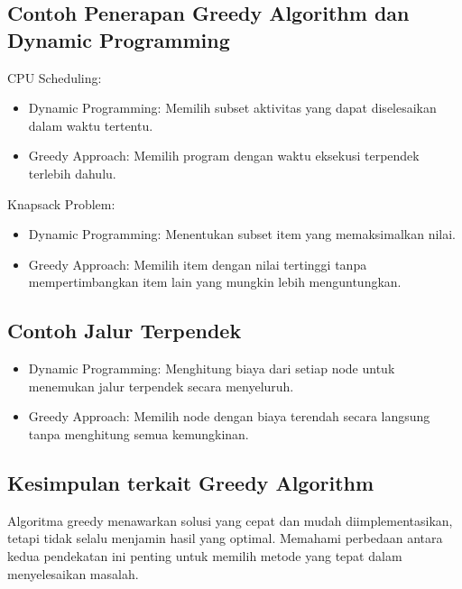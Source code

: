 \documentclass{article}
\begin{document}
\subsection{Contoh Penerapan Greedy Algorithm dan Dynamic Programming}
CPU Scheduling:
\begin{itemize}
    \item Dynamic Programming: Memilih subset aktivitas yang dapat diselesaikan dalam waktu tertentu.
    \item Greedy Approach: Memilih program dengan waktu eksekusi terpendek terlebih dahulu.
\end{itemize}
Knapsack Problem:
\begin{itemize}
    \item Dynamic Programming: Menentukan subset item yang memaksimalkan nilai.
    \item Greedy Approach: Memilih item dengan nilai tertinggi tanpa mempertimbangkan item lain yang mungkin lebih menguntungkan.
\end{itemize}

\subsection{Contoh Jalur Terpendek}
\begin{itemize}
    \item Dynamic Programming: Menghitung biaya dari setiap node untuk menemukan jalur terpendek secara menyeluruh.
    \item Greedy Approach: Memilih node dengan biaya terendah secara langsung tanpa menghitung semua kemungkinan.
\end{itemize}

\subsection{Kesimpulan terkait Greedy Algorithm}
Algoritma greedy menawarkan solusi yang cepat dan mudah diimplementasikan, tetapi tidak selalu menjamin hasil yang optimal. Memahami perbedaan antara kedua pendekatan ini penting untuk memilih metode yang tepat dalam menyelesaikan masalah.

\end{document}
